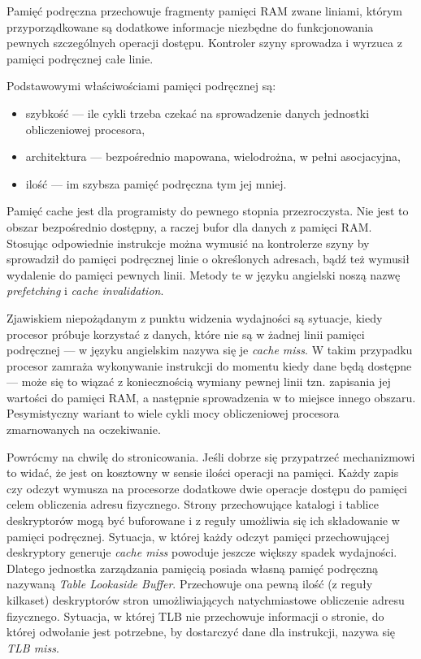 \documentclass[12pt,a4paper,titlepage,twoside]{mwart}
\begin{document}
Pamięć podręczna przechowuje fragmenty pamięci RAM zwane liniami, którym
przyporządkowane są dodatkowe informacje niezbędne do funkcjonowania pewnych
szczególnych operacji dostępu. Kontroler szyny sprowadza i wyrzuca z pamięci
podręcznej całe linie.

Podstawowymi właściwościami pamięci podręcznej są:
\begin{itemize}
\item szybkość --- ile cykli trzeba czekać na sprowadzenie danych jednostki
obliczeniowej procesora,
\item architektura --- bezpośrednio mapowana, wielodrożna, w pełni asocjacyjna,
\item ilość --- im szybsza pamięć podręczna tym jej mniej. 
\end{itemize}

Pamięć cache jest dla programisty do pewnego stopnia przezroczysta. Nie jest to
obszar bezpośrednio dostępny, a raczej bufor dla danych z pamięci RAM. Stosując
odpowiednie instrukcje można wymusić na kontrolerze szyny by sprowadził do
pamięci podręcznej linie o określonych adresach, bądź też wymusił wydalenie do
pamięci pewnych linii. Metody te w języku angielski noszą nazwę
\textit{prefetching} i \textit{cache invalidation}.

Zjawiskiem niepożądanym z punktu widzenia wydajności są sytuacje, kiedy
procesor próbuje korzystać z danych, które nie są w żadnej linii pamięci
podręcznej --- w języku angielskim nazywa się je \textit{cache miss}. W takim
przypadku procesor zamraża wykonywanie instrukcji do momentu kiedy dane będą
dostępne --- może się to wiązać z koniecznością wymiany pewnej linii tzn.
zapisania jej wartości do pamięci RAM, a następnie sprowadzenia w to miejsce
innego obszaru. Pesymistyczny wariant to wiele cykli mocy obliczeniowej
procesora zmarnowanych na oczekiwanie.

Powrócmy na chwilę do stronicowania. Jeśli dobrze się przypatrzeć mechanizmowi
to widać, że jest on kosztowny w sensie ilości operacji na pamięci. Każdy zapis
czy odczyt wymusza na procesorze dodatkowe dwie operacje dostępu do pamięci
celem obliczenia adresu fizycznego. Strony przechowujące katalogi i tablice
deskryptorów mogą być buforowane i z reguły umożliwia się ich składowanie w
pamięci podręcznej. Sytuacja, w której każdy odczyt pamięci przechowującej
deskryptory generuje \textit{cache miss} powoduje jeszcze większy spadek
wydajności. Dlatego jednostka zarządzania pamięcią posiada własną pamięć
podręczną nazywaną \textit{Table Lookaside Buffer}. Przechowuje ona pewną ilość
(z reguły kilkaset) deskryptorów stron umożliwiających natychmiastowe
obliczenie adresu fizycznego. Sytuacja, w której TLB nie przechowuje informacji
o stronie, do której odwołanie jest potrzebne, by dostarczyć dane dla
instrukcji, nazywa się \textit{TLB miss}.
\end{document}
